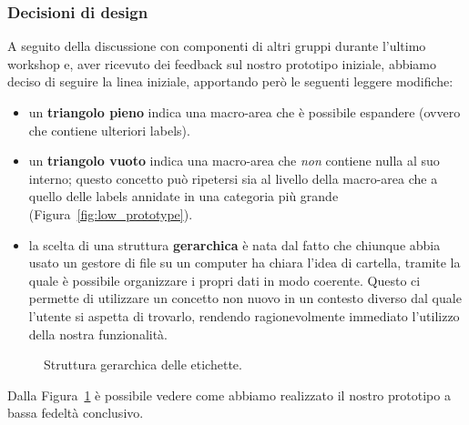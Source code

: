 \documentclass[12pt]{article} %
\begin{document}
\subsubsection{Decisioni di design}
A seguito della discussione con componenti di altri gruppi durante l'ultimo workshop e, aver ricevuto dei feedback sul nostro prototipo iniziale, abbiamo deciso di seguire la linea iniziale, apportando per\`o le seguenti leggere modifiche:
\begin{itemize}
\item un \textbf{triangolo pieno} indica una macro-area che \`e possibile espandere (ovvero che contiene ulteriori labels).
\item un \textbf{triangolo vuoto} indica una macro-area che \emph{non} contiene nulla al suo interno; questo concetto pu\`o ripetersi sia al livello della macro-area che a quello delle labels annidate in una categoria pi\`u grande (Figura~\ref{fig:low_prototype}).
\item la scelta di una struttura \textbf{gerarchica} \`e nata dal fatto che chiunque abbia usato un gestore di file su un computer ha chiara l'idea di cartella, tramite la quale \`e possibile organizzare i propri dati in modo coerente. Questo ci permette di utilizzare un concetto non nuovo in un contesto diverso dal quale l'utente si aspetta di trovarlo, rendendo ragionevolmente immediato l'utilizzo della nostra funzionalit\`a.
\end{itemize}

\begin{figure}[H]
\caption{Struttura gerarchica delle etichette.}
\label{fig:low_prototype2}
\end{figure}

Dalla Figura~\ref{fig:low_prototype2} \`e possibile vedere come abbiamo realizzato il nostro prototipo a bassa fedelt\`a conclusivo.\\
\end{document}

